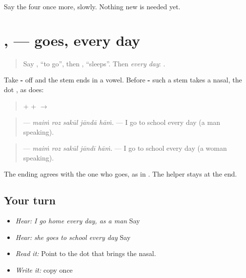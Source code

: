 \begin{tcolorbox}[breakable,colback=teal!4,colframe=teal!35!black,title={Before you move on}]
Say the four once more, slowly. Nothing new is needed yet.
\end{tcolorbox}
\section[\texorpdfstring{\pa{ਜਾਂਦਾ} · \pa{ਜਾਂਦੀ} (jāndā · jāndī)}{ਜਾਂਦਾ · ਜਾਂਦੀ (jāndā · jāndī)}]{,  — goes, every day}

\label{lesson:PA-C211-janda}



\begin{quote}
Say \textbf{}, \textquotedblleft{}to go\textquotedblright{}, then \textbf{}, \textquotedblleft{}sleeps\textquotedblright{}. Then \emph{every day}: \textbf{}.
\end{quote}

\begin{grammarlens}[title={Grammar Lens: a stem that ends in a vowel}]
Take \textbf{-} off \textbf{} and the stem \textbf{} ends in a vowel. Before \textbf{-} such a stem takes a nasal, the dot \textbf{}, as \textbf{} does:

\begin{quote}
\textbf{} + \textbf{} + \textbf{} $\to$ \textbf{}
\end{quote}

\begin{quote}
\textbf{    } — \emph{maiṁ roz sakūl jāndā hāṁ.} — I go to school every day (a man speaking).
\end{quote}

\begin{quote}
\textbf{    } — \emph{maiṁ roz sakūl jāndī hāṁ.} — I go to school every day (a woman speaking).
\end{quote}

The ending agrees with the one who goes, as in \textbf{   }. The helper \textbf{} stays at the end.
\end{grammarlens}

\subsection*{Your turn}
\begin{itemize}
\raggedright
  \item \emph{Hear:} \emph{I go home every day, as a man} Say \textbf{    }
  \item \emph{Hear:} \emph{she goes to school every day} Say \textbf{    }
  \item \emph{Read it:} \textbf{} Point to the dot that brings the nasal.
  \item \emph{Write it:} copy \textbf{} once
\end{itemize}

